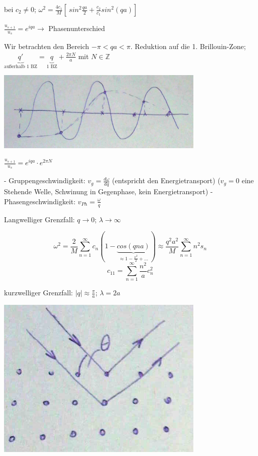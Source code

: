 bei \(c_2\neq 0\); \(\omega^2 = \frac{4c_1}{M}\left[\ sin^2\frac{qa}{2} + \frac{c_2}{c_1}sin^2(qa) \right]\)

\(\frac{u_{s+1}}{u_s} = e^{iqa}\rightarrow\) Phasenunterschied

Wir betrachten den Bereich \(-\pi < qa < \pi\). Reduktion auf die 1. Brillouin-Zone; \(\underbrace{q'}_{\text{außerhalb 1 BZ}}=\underbrace{q}_{\text{1 BZ}}+\frac{2\pi N}{a}\) mit \(N\in \mathbb Z\)

\includegraphics[width=0.75\textwidth]{kap06_03.png}

\(\frac{u_{s+1}}{u_s} = e^{iqa}\cdot e^{2\pi N}\)

- Gruppengeschwindigkeit: \(v_g = \frac{d\omega}{dq}\) (entspricht den Energietransport) (\(v_g=0\) eine Stehende Welle, Schwinung in Gegenphase, kein Energietransport)
- Phasengeschwindigkeit: \(v_{Ph} = \frac{\omega}{q}\)

Langwelliger Grenzfall: \(q\rightarrow 0\); \(\lambda \rightarrow \infty\)

\[\omega^2 = \frac{2}{M} \sum^{\infty}_{n=1}c_n(1-\underbrace{cos(qna)}_{\approx 1-\frac{x^2}{2}+...})\approx \frac{q^2a^2}{M}\sum^{\infty}_{n=1}n^2s_n\]
\[ c_{11} = \sum^{\infty}_{n=1} \frac{n^2}{a}c^2_n\]

kurzwelliger Grenzfall: \(|q|\approx \frac{\pi}{a}\); \(\lambda = 2a\)

 \includegraphics[width=0.75\textwidth]{kap06_04.png}

